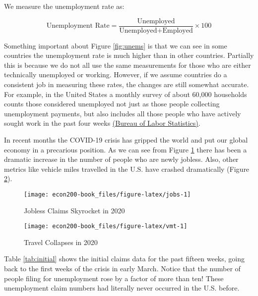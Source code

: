 \documentclass[
]{book}
\begin{document}
We measure the unemployment rate as:

\[ \text{Unemployment Rate} = \frac{\text{Unemployed}}{\text{Unemployed} + \text{Employed}} \times 100 \]

Something important about Figure \ref{fig:unems} is that we can see in some countries the unemployment rate is much higher than in other countries. Partially this is because we do not all use the same measurements for those who are either technically unemployed or working. However, if we assume countries do a consistent job in measuring these rates, the changes are still somewhat accurate. For example, in the United States a monthly survey of about 60,000 households counts those considered unemployed not just as those people collecting unemployment payments, but also includes all those people who have actively sought work in the past four weeks \href{https://www.bls.gov/cps/cps_htgm.htm}{(Bureau of Labor Statistics)}.

In recent months the COVID-19 crisis has gripped the world and put our global economy in a precarious position. As we can see from Figure \ref{fig:jobs} there has been a dramatic increase in the number of people who are newly jobless. Also, other metrics like vehicle miles travelled in the U.S. have crashed dramatically (Figure \ref{fig:vmt}).

\begin{figure}

{\centering \texttt{[image: econ200-book\_files/figure-latex/jobs-1]} 

}

\caption{Jobless Claims Skyrocket in 2020}\label{fig:jobs}
\end{figure}

\begin{figure}

{\centering \texttt{[image: econ200-book\_files/figure-latex/vmt-1]} 

}

\caption{Travel Collapses in 2020}\label{fig:vmt}
\end{figure}

Table \ref{tab:initial} shows the initial claims data for the past fifteen weeks, going back to the first weeks of the crisis in early March. Notice that the number of people filing for unemployment rose by a factor of more than ten! These unemployment claim numbers had literally never occurred in the U.S. before.
\end{document}
